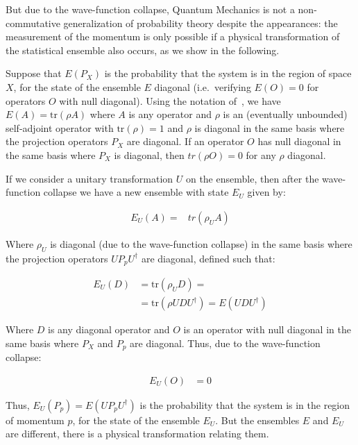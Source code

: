 \documentclass[11pt]{book}
\begin{document}
But due to the wave-function collapse, Quantum Mechanics is not a
non-commutative generalization of probability theory despite the
appearances: the measurement of the momentum is only possible if a
physical transformation of the statistical ensemble also occurs, as we
show in the following.

Suppose that \(E(P_X)\) is the probability that the system is in the
region of space \(X\), for the state of the ensemble \(E\) diagonal
(i.e.~verifying \(E(O)=0\) for operators \(O\) with null diagonal).
Using the notation of~\cite{2020Density}, we have \(E(A)=\mathrm{tr}(\rho A)\) where \(A\) is any operator
and \(\rho\) is an (eventually unbounded) self-adjoint operator with
\(\mathrm{tr}(\rho)=1\) and \(\rho\) is diagonal in the same basis where
the projection operators \(P_X\) are diagonal. If an operator \(O\) has
null diagonal in the same basis where \(P_X\) is diagonal, then
\(tr(\rho O)=0\) for any \(\rho\) diagonal.

If we consider a unitary transformation \(U\) on the ensemble, then
after the wave-function collapse\cite{Brun_2002} we have a new ensemble with state \(E_U\) given by:

\begin{equation}\begin{aligned}
    E_U(A)=&tr(\rho_U A)\end{aligned}\end{equation}

Where \(\rho_U\) is diagonal (due to the wave-function collapse) in the
same basis where the projection operators \(U P_p U^\dagger\) are
diagonal, defined such that:

\begin{equation}\begin{aligned}
    E_U(D)&= \mathrm{tr}(\rho_U D)=\\
    &=\mathrm{tr}(\rho U D U^\dagger)=E(U D U^\dagger)\end{aligned}\end{equation}

Where \(D\) is any diagonal operator and \(O\) is an operator with null
diagonal in the same basis where \(P_X\) and \(P_p\) are diagonal. Thus,
due to the wave-function collapse:

\begin{equation}\begin{aligned}E_U(O)&=0\end{aligned}\end{equation}

Thus, \(E_U(P_p)=E(U P_p U^\dagger)\) is the probability that the system
is in the region of momentum \(p\), for the state of the ensemble
\(E_U\). But the ensembles \(E\) and \(E_U\) are different, there is a
physical transformation relating them.
\end{document}
